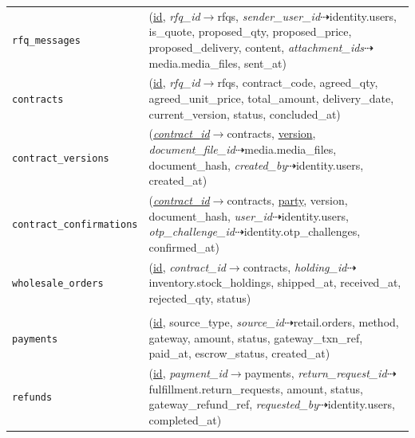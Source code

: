 \begin{longtable}{L{3.10cm} L{11.90cm}}
\texttt{rfq\_\allowbreak{}messages} & (\underline{id}, \textit{rfq\_\allowbreak{}id}$\rightarrow$rfqs, \textit{sender\_\allowbreak{}user\_\allowbreak{}id}$\dashrightarrow$identity.users, is\_\allowbreak{}quote, proposed\_\allowbreak{}qty, proposed\_\allowbreak{}price, proposed\_\allowbreak{}delivery, content, \textit{attachment\_\allowbreak{}ids}$\dashrightarrow$media.media\_\allowbreak{}files, sent\_\allowbreak{}at) \\
\texttt{contracts} & (\underline{id}, \textit{rfq\_\allowbreak{}id}$\rightarrow$rfqs, contract\_\allowbreak{}code, agreed\_\allowbreak{}qty, agreed\_\allowbreak{}unit\_\allowbreak{}price, total\_\allowbreak{}amount, delivery\_\allowbreak{}date, current\_\allowbreak{}version, status, concluded\_\allowbreak{}at) \\
\texttt{contract\_\allowbreak{}versions} & (\textit{\underline{contract\_\allowbreak{}id}}$\rightarrow$contracts, \underline{version}, \textit{document\_\allowbreak{}file\_\allowbreak{}id}$\dashrightarrow$media.media\_\allowbreak{}files, document\_\allowbreak{}hash, \textit{created\_\allowbreak{}by}$\dashrightarrow$identity.users, created\_\allowbreak{}at) \\
\texttt{contract\_\allowbreak{}confirmations} & (\textit{\underline{contract\_\allowbreak{}id}}$\rightarrow$contracts, \underline{party}, version, document\_\allowbreak{}hash, \textit{user\_\allowbreak{}id}$\dashrightarrow$identity.users, \textit{otp\_\allowbreak{}challenge\_\allowbreak{}id}$\dashrightarrow$identity.otp\_\allowbreak{}challenges, confirmed\_\allowbreak{}at) \\
\texttt{wholesale\_\allowbreak{}orders} & (\underline{id}, \textit{contract\_\allowbreak{}id}$\rightarrow$contracts, \textit{holding\_\allowbreak{}id}$\dashrightarrow$inventory.stock\_\allowbreak{}holdings, shipped\_\allowbreak{}at, received\_\allowbreak{}at, rejected\_\allowbreak{}qty, status) \\
 \\
\texttt{payments} & (\underline{id}, source\_\allowbreak{}type, \textit{source\_\allowbreak{}id}$\dashrightarrow$retail.orders, method, gateway, amount, status, gateway\_\allowbreak{}txn\_\allowbreak{}ref, paid\_\allowbreak{}at, escrow\_\allowbreak{}status, created\_\allowbreak{}at) \\
\texttt{refunds} & (\underline{id}, \textit{payment\_\allowbreak{}id}$\rightarrow$payments, \textit{return\_\allowbreak{}request\_\allowbreak{}id}$\dashrightarrow$fulfillment.return\_\allowbreak{}requests, amount, status, gateway\_\allowbreak{}refund\_\allowbreak{}ref, \textit{requested\_\allowbreak{}by}$\dashrightarrow$identity.users, completed\_\allowbreak{}at) \\

\end{longtable}
